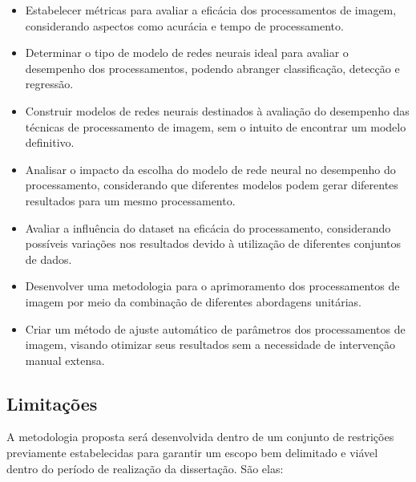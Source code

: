 \documentclass[12pt]{article}
\begin{document}
\begin{itemize}
    \item Estabelecer métricas para avaliar a eficácia dos processamentos de imagem, considerando aspectos como acurácia e tempo de processamento.
    \item Determinar o tipo de modelo de redes neurais ideal para avaliar o desempenho dos processamentos, podendo abranger classificação, detecção e regressão.
    \item Construir modelos de redes neurais destinados à avaliação do desempenho das técnicas de processamento de imagem, sem o intuito de encontrar um modelo definitivo.
    \item Analisar o impacto da escolha do modelo de rede neural no desempenho do processamento, considerando que diferentes modelos podem gerar diferentes resultados para um mesmo processamento.
    \item Avaliar a influência do dataset na eficácia do processamento, considerando possíveis variações nos resultados devido à utilização de diferentes conjuntos de dados.
    \item Desenvolver uma metodologia para o aprimoramento dos processamentos de imagem por meio da combinação de diferentes abordagens unitárias.
    \item Criar um método de ajuste automático de parâmetros dos processamentos de imagem, visando otimizar seus resultados sem a necessidade de intervenção manual extensa.
\end{itemize}

\subsection{Limitações}

A metodologia proposta será desenvolvida dentro de um conjunto de restrições previamente estabelecidas para garantir um escopo bem delimitado e viável dentro do período de realização da dissertação. São elas:
\end{document}
